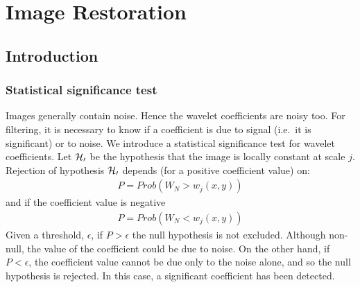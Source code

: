 \chapter{\proj Image Restoration}
\label{ch_restore}
\section{Introduction}
\subsection{Statistical significance test}
Images generally contain noise. Hence the wavelet coefficients are 
noisy too. For filtering, it is necessary to know if a
coefficient is due to signal (i.e.\ it is significant) or to noise. 
We introduce a statistical significance 
test for wavelet coefficients. Let $\cal H_0$ be the hypothesis that the 
image is locally constant at scale $j$.  
Rejection of hypothesis $\cal H_0$ depends (for a positive coefficient value)
on:
\begin{eqnarray*}
P = Prob(W_N > w_j(x,y))  
\end{eqnarray*}
and if the coefficient value is negative 
\begin{eqnarray*}
P = Prob(W_N < w_j(x,y))  
\end{eqnarray*}
Given a threshold, $\epsilon$, if $P > \epsilon$ the null hypothesis is not
excluded.  Although non-null, the value of the coefficient could be due to 
noise.  On the other hand, if $P < \epsilon$, the coefficient value cannot be
due only to the noise alone, and so the null hypothesis is rejected.  In this
case, a significant coefficient has been detected.
 
